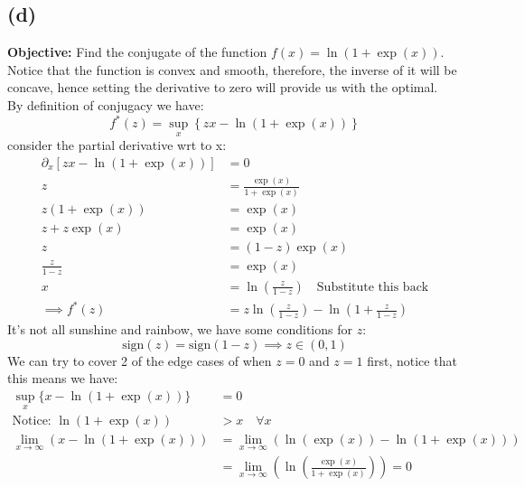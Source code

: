 \documentclass[]{article}
\begin{document}
    \subsection*{(d)}
        \textbf{Objective:} Find the conjugate of the function $f(x)=\ln(1 + \exp(x))$. Notice that the function is convex and smooth, therefore, the inverse of it will be concave, hence setting the derivative to zero will provide us with the optimal. 
        \\
        By definition of conjugacy we have: 
        $$
            f^*(z) = \sup_x \left\lbrace
            zx - \ln(1 + \exp(x))
            \right\rbrace
        $$
        consider the partial derivative wrt to x: 
        \begin{align*}\tag{1d1}\label{eqn:1d1}
           \partial_x [zx - \ln(1 + \exp(x))] &= 0
           \\
           z &= \frac{\exp(x)}{1 + \exp(x)}
           \\
           z(1 + \exp(x)) &= \exp(x)
           \\
           z + z\exp(x) &= \exp(x)
           \\
           z &= (1 - z)\exp(x)
           \\
           \frac{z}{1 - z} &= \exp(x)
           \\
           x &= \ln
           \left(
               \frac{z}{1 - z}
           \right)  \quad \text{Substitute this back}
           \\
           \implies
           f^*(z) &= 
           z\ln \left(
               \frac{z}{1 - z}
           \right)
           - 
           \ln \left(
               1 + \frac{z}{1 - z}
           \right)
        \end{align*}
        It's not all sunshine and rainbow, we have some conditions for $z$: 
        \begin{equation*}\tag{1d2}\label{eqn:1d2}
            \text{sign}(z) = \text{sign}(1 - z) \implies z \in (0, 1)
        \end{equation*}
        We can try to cover 2 of the edge cases of when $z = 0$ and $z = 1$ first, notice that this means we have: 
        \begin{align*}\tag{1d3}\label{eqn:1d3}
            \sup_x\{x - \ln(1 + \exp(x))\} &= 0
            \\
            \text{Notice: } \ln(1 + \exp(x)) &> x \quad \forall x
            \\
            \lim_{x\rightarrow\infty}(x - \ln(1 + \exp(x))) & = \lim_{x\rightarrow\infty}(\ln(\exp(x)) - \ln(1 + \exp(x)))
            \\
            &= \lim_{x\rightarrow \infty} \left(
                \ln 
                    \left(
                        \frac{\exp(x)}{1 + \exp(x)}
                    \right)
            \right) = 0
        \end{align*}
\end{document}
